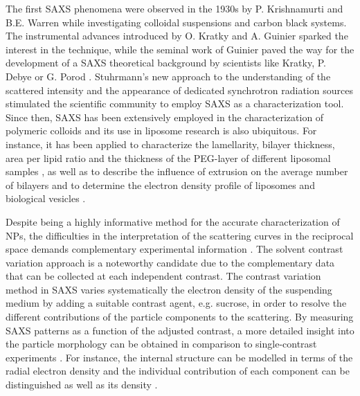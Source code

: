 The first SAXS phenomena were observed in the 1930s by P. Krishnamurti and B.E. Warren \citep{krishnamurti_saxs_1930, warren_xray_1934} while investigating colloidal suspensions and carbon black systems. The instrumental advances introduced by O. Kratky and A. Guinier \citep{guinier_dispositif_1937,kratky_berechnung_1938} sparked the interest in the technique, while the seminal work of Guinier \citep{guinier_diffraction_1939} paved the way for the development of a SAXS theoretical background by scientists like Kratky, P. Debye or G. Porod \citep{kratky_bestimmung_1943,debye_scattering_1949,kratky_diffuse_1949,guinier_study_1950,guinier_small-angle_1955}. Stuhrmann's new approach to the understanding of the scattered intensity \citep{stuhrmann_elimination_1965} and the appearance of dedicated synchrotron radiation sources stimulated the scientific community to employ SAXS as a characterization tool. Since then, SAXS has been extensively employed in the characterization of polymeric colloids \citep{dingenouts_analysis_1999,chu_small-angle_2001,ballauff_analysis_2011} and its use in liposome research is also ubiquitous. For instance, it has been applied to characterize the lamellarity, bilayer thickness, area per lipid ratio \citep{pabst_applications_2010,bouwstra_small_1993,brzustowicz_x-ray_2005} and the thickness of the PEG-layer of different liposomal samples \citep{varga_closer_2010,varga_characterization_2012}, as well as to describe the influence of extrusion on the average number of bilayers \citep{jousma_characterization_1987} and to determine the electron density profile of liposomes \citep{bouwstra_small_1993,brzustowicz_x-ray_2005,hirai_determination_2003} and biological vesicles \citep{castorph_structure_2010}.

Despite being a highly informative method for the accurate characterization of NPs, the difficulties in the interpretation of the scattering curves in the reciprocal space demands complementary experimental information \citep{mykhaylyk_structural_2012}. The solvent contrast variation approach is a noteworthy candidate due to the complementary data that can be collected at each independent contrast. The contrast variation method in SAXS varies systematically the electron density of the suspending medium by adding a suitable contrast agent, e.g. sucrose, in order to resolve the different contributions of the particle components to the scattering. By measuring SAXS patterns as a function of the adjusted contrast, a more detailed insight into the particle morphology can be obtained in comparison to single-contrast experiments \citep{bolze_situ_2004}. For instance, the internal structure can be modelled in terms of the radial electron density \citep{dingenouts_radial_1994,dingenouts_analysis_1999,ballauff_analysis_2011,ballauff_small-angle_1996} and the individual contribution of each component can be distinguished \citep{beyer_saxs_1990,grunder_analysis_1991,grunder_small-angle_1993,ottewill_characterization_1995,bolze_small-angle_1997,dingenouts_structure_1994} as well as its density \citep{mykhaylyk_application_2007}.

